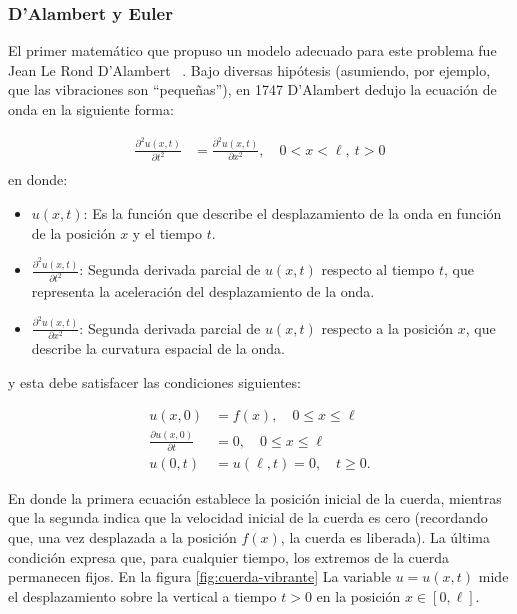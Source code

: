 \subsubsection{D’Alambert y Euler}
El primer matemático que propuso un modelo adecuado para este problema fue Jean Le Rond D’Alambert ~\cite{unal_52162}. Bajo diversas hipótesis (asumiendo, por ejemplo, que las vibraciones son ``pequeñas''), en 1747 D’Alambert dedujo la ecuación de onda en la siguiente forma:

\begin{equation} \label{eq1}
	\begin{split}
		\frac{\partial^2 u(x,t)}{\partial t^2} &=  \frac{\partial^2 u(x,t)}{\partial x^2}, \quad 0 < x < \ell, \ t > 0 \\
	\end{split}
\end{equation}
en donde:
\begin{itemize}
	\item \( u(x,t) \): Es la función que describe el desplazamiento de la onda en función de la posición \( x \) y el tiempo \( t \).
	\item \( \frac{\partial^2 u(x,t)}{\partial t^2} \): Segunda derivada parcial de \( u(x,t) \) respecto al tiempo \( t \), que representa la aceleración del desplazamiento de la onda.
	\item \( \frac{\partial^2 u(x,t)}{\partial x^2} \): Segunda derivada parcial de \( u(x,t) \) respecto a la posición \( x \), que describe la curvatura espacial de la onda.
\end{itemize}

 y esta debe satisfacer las condiciones siguientes:

\begin{equation} \label{eq2}
	\begin{split}
		u(x,0) &= f(x), \quad 0 \leq x \leq \ell \\
		\frac{\partial u(x,0)}{\partial t} &= 0, \quad 0 \leq x \leq \ell \\
		u(0,t) &= u(\ell,t) = 0, \quad t \geq 0.
	\end{split}
\end{equation}


En donde la primera ecuación establece la posición inicial de la cuerda, mientras que la segunda indica que la velocidad inicial de la cuerda es cero (recordando que, una vez desplazada a la posición $f(x)$, la cuerda es liberada). La última condición expresa que, para cualquier tiempo, los extremos de la cuerda permanecen fijos. En la figura \ref{fig:cuerda-vibrante} La variable $u = u(x,t)$ mide el desplazamiento sobre la vertical a tiempo $t > 0$ en la posición $x \in [0,\ell]$.

